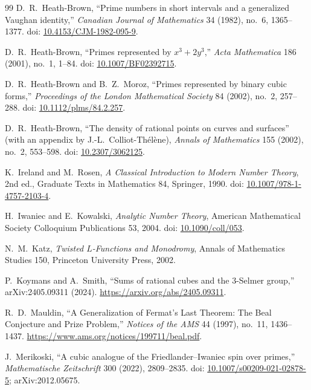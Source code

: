 \documentclass[11pt,a4paper]{article}
\begin{document}
\begin{thebibliography}{99}
D.~R.~Heath-Brown, ``Prime numbers in short intervals and a
generalized Vaughan identity,''
\emph{Canadian Journal of Mathematics} 34 (1982), no.\ 6, 1365--1377.
doi: \href{https://doi.org/10.4153/CJM-1982-095-9}{10.4153/CJM-1982-095-9}.

D.~R.~Heath-Brown, ``Primes represented by $x^3+2y^3$,''
\emph{Acta Mathematica} 186 (2001), no.\ 1, 1--84. doi:
\href{https://doi.org/10.1007/BF02392715}{10.1007/BF02392715}.

D.~R.~Heath-Brown and B.~Z.~Moroz, ``Primes represented by binary
cubic forms,'' \emph{Proceedings of the London Mathematical Society}
84 (2002), no.\ 2, 257--288. doi:
\href{https://doi.org/10.1112/plms/84.2.257}{10.1112/plms/84.2.257}.

D.~R.~Heath-Brown, ``The density of rational points on curves and
surfaces'' (with an appendix by J.-L.~Colliot-Th\'el\`ene),
\emph{Annals of Mathematics} 155 (2002), no.\ 2, 553--598. doi:
\href{https://doi.org/10.2307/3062125}{10.2307/3062125}.

K.~Ireland and M.~Rosen, \emph{A Classical Introduction to Modern
Number Theory}, 2nd ed., Graduate Texts in Mathematics 84,
Springer, 1990. doi:
\href{https://doi.org/10.1007/978-1-4757-2103-4}{10.1007/978-1-4757-2103-4}.

H.~Iwaniec and E.~Kowalski, \emph{Analytic Number Theory},
American Mathematical Society Colloquium Publications 53, 2004. doi:
\href{https://doi.org/10.1090/coll/053}{10.1090/coll/053}.

N.~M.~Katz, \emph{Twisted $L$-Functions and Monodromy},
Annals of Mathematics Studies 150, Princeton University Press, 2002.

P.~Koymans and A.~Smith, ``Sums of rational cubes and the $3$-Selmer
group,'' arXiv:2405.09311 (2024).
\url{https://arxiv.org/abs/2405.09311}.

R.~D.~Mauldin, ``A Generalization of Fermat's Last Theorem: The Beal
Conjecture and Prize Problem,''
\emph{Notices of the AMS} 44 (1997), no.\ 11, 1436--1437.
\url{https://www.ams.org/notices/199711/beal.pdf}.

J.~Merikoski, ``A cubic analogue of the Friedlander--Iwaniec spin over
primes,'' \emph{Mathematische Zeitschrift} 300 (2022), 2809--2835.
doi: \href{https://doi.org/10.1007/s00209-021-02878-5}{10.1007/s00209-021-02878-5};
arXiv:2012.05675.


\end{thebibliography}
\end{document}
